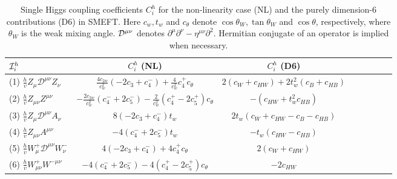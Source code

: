\begin{table}[!t]
\begin{center}
\caption{Single Higgs coupling coefficients $C_i^h$ for the non-linearity case (NL) and the  purely dimension-6 contributions (D6) in SMEFT. Here  $c_w, t_w$ and $c_\theta$ denote $\cos\theta_W, \tan\theta_W$ and $\cos\theta$, respectively, where $\theta_W$ is the weak mixing angle. ${\cal D}^{\mu\nu}$ denotes $\partial^\mu \partial^\nu - \eta^{\mu\nu} \partial^2$. Hermitian conjugate of an operator is implied when necessary.}\label{tab:oneh}
\begin{tabular}{lc c c c ccc}\hline\hline
${\cal I}^{h}_i$ &   $  C^h_i$ (NL)& $  C^h_i$ (D6)\\
 \hline
(1) $  \frac{h}{v} Z_{\mu} {\mathcal{D}}^{\mu \nu} Z_{\nu}$ & $ \frac{4 c_{ 2 w} }{c^2_{w}}  (-2 c_3  + c_4^- )  
+\frac{4}{c^2_{w}}   c_4^+ c_\theta $ &$ 2 (c_W + c_{HW}) +2 t^2 _{w} (c_B + c_{HB})$\\
(2)  $ \frac{h}{v}  Z_{\mu\nu} Z^{\mu\nu}$ & $  -\frac{2  c_{2 w}}{c^2_{w}}  ( c_4^-  + 2 c_5^- ) -\frac{2 }{c^2_{w}}   ( c_4^+  - 2 c_5^+ ) c_\theta    $&$-( c_{HW} + t^2_{w} c_{HB})$\\
(3)  $ \frac{h}{v}  Z_{\mu} {\mathcal{D}}^{\mu \nu} A_{\nu}$ & $8  ( - 2 c_3  +   c_4^- )  t_{ w} $& $ 2 t_w (c_W + c_{HW}-c_B - c_{HB})  $ \\
(4) $ \frac{h}{v}  Z_{\mu\nu} A^{\mu\nu}$ & $-4  (  c_4^-   +2 c_5^- )  t_{ w} $&  $ -  t_w(c_{HW}- c_{HB})$\\
(5)  $ \frac{h}{v}  W^+_{\mu} {\mathcal{D}}^{\mu \nu} W^-_{\nu}$ & $4 (-2 c_3  + c_4^- ) 
+  4 c_4^+ c_\theta $ & $2 (c_W + c_{HW})$\\
(6) $ \frac{h}{v}  W^+_{\mu\nu} W^{-\mu\nu} $ & $ -4( c_4^- + 2 c_5^-)   -4 ( c_4^+  - 2 c_5^+) c_\theta $&   $-2 c_{HW} $ \\
\hline\hline
\end{tabular}
\end{center}
\end{table}

